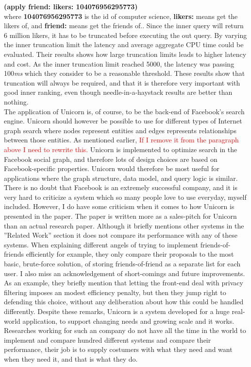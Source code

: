 \documentclass{article}
\begin{document}
\noindent \textbf{(apply friend: likers: 104076956295773)}\\

where \textbf{104076956295773} is the id of computer science, \textbf{likers:} means get the likers of, and \textbf{friend:} means get the friends of.. Since the inner query will return 6 million likers, it has to be truncated before executing the out query. By varying the inner truncation limit the latency and average aggregate CPU time could be evaluated. Their results shows how large truncation limits leads to higher latency and cost. As the inner truncation limit reached 5000, the latency was passing 100\textit{ms} which they consider to be a reasonable threshold. These results show that truncation will always be required, and that it is therefore very important with good inner ranking, even though needle-in-a-haystack results are better than nothing. \\

\noindent The application of Unicorn is, of course, to be the back-end of Facebook's search engine. Unicorn should however be possible to use for different types of Internet graph search where nodes represent entities and edges represents relationships between those entities. As mentioned earlier, \textcolor{red}{If I remove it from the paragraph above I need to rewrite this.} Unicorn is implemented to optimize search in the Facebook social graph, and therefore lots of design choices are based on Facebook-specific properties. Unicorn would therefore be most useful for applications where the graph structure, data model, and query logic is similar. \\

\noindent There is no doubt that Facebook is an extremely successful company, and it is very hard to criticize a system which so many people love to use everyday, myself included. However, I do have some criticism when it comes to how Unicorn is presented in the paper. The paper is written more as a sales-pitch for Unicorn than an actual research paper. Although it briefly mentions other systems in the ''Related Work'' section it does not compare its performance with any of these systems. When explaining different angels of trying to implement friends-of-friends efficiently for example, they only compare their proposals to the most basic, brute-force solution, of storing friends-of-friend as a separate list for each user. I also miss an acknowledgement of short-comings and future improvements. As an example, they briefly mention that letting the front-end deal with privacy filtering imposes an modest efficiency penalty, but then they jump right to defending this choice, without any deliberation about how this could be handled differently. Despite these remarks, Unicorn is a system developed for a huge real-world application, to support changing needs and growing scale and it works. Researches working for such an company do not have all the time in the world to implement and compare hundred different systems and compare their performance, their job is to supply costumers with what they need and want when they need it, and that is what they do.
\end{document}
